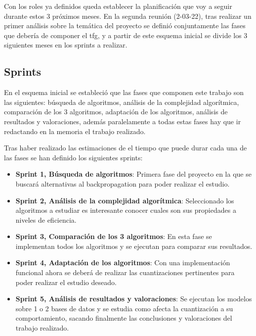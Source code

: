 Con los roles ya definidos queda establecer la planificación que voy a seguir durante estos 3 próximos meses. En la segunda reunión (2-03-22), tras realizar un primer análisis sobre la temática del proyecto se definió conjuntamente las fases que debería de componer el tfg, y a partir de este esquema inicial se divide los 3 siguientes meses en los sprints a realizar.

\subsection{Sprints}

En el esquema inicial se estableció que las fases que componen este trabajo son las siguientes: búsqueda de algoritmos, análisis de la complejidad algorítmica, comparación de los 3 algoritmos, adaptación de los algoritmos, análisis de resultados y valoraciones, además paralelamente a todas estas fases hay que ir redactando en la memoria el trabajo realizado.

Tras haber realizado las estimaciones de el tiempo que puede durar cada una de las fases se han definido los siguientes sprints:

\begin{itemize}
    \item \textbf{Sprint 1, Búsqueda de algoritmos}: Primera fase del proyecto en la que se buscará alternativas al backpropagation para poder realizar el estudio.
    \item \textbf{Sprint 2, Análisis de la complejidad algorítmica}: Seleccionado los algoritmos a estudiar es interesante conocer cuales son sus propiedades a niveles de eficiencia.
    \item \textbf{Sprint 3, Comparación de los 3 algoritmos}: En esta fase se implementan todos los algoritmos y se ejecutan para comparar sus resultados.
    \item \textbf{Sprint 4, Adaptación de los algoritmos}: Con una implementación funcional ahora se deberá de realizar las cuantizaciones pertinentes para poder realizar el estudio deseado.
    \item \textbf{Sprint 5, Análisis de resultados y valoraciones}: Se ejecutan los modelos sobre 1 o 2 bases de datos y se estudia como afecta la cuantización a su comportamiento, sacando finalmente las conclusiones y valoraciones del trabajo realizado.
\end{itemize}








